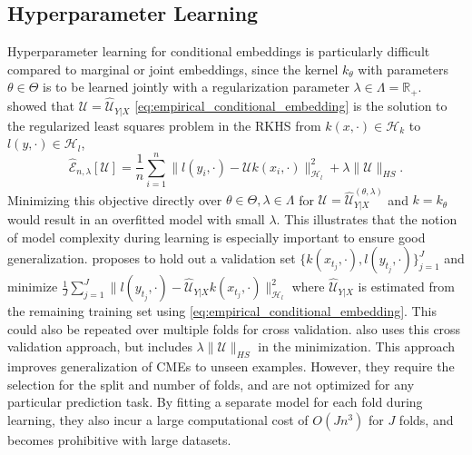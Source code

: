\documentclass[twoside]{article}
\begin{document}
		\subsection{Hyperparameter Learning}
		
			Hyperparameter learning for conditional embeddings is particularly difficult compared to marginal or joint embeddings, since the kernel $k_{\theta}$ with parameters $\theta \in \Theta$ is to be learned jointly with a regularization parameter $\lambda \in \Lambda = \mathbb{R}_{+}$. \cite{lever2012conditional} showed that $\mathcal{U} = \hat{\mathcal{U}}_{Y | X}$ \eqref{eq:empirical_conditional_embedding} is the solution to the regularized least squares problem in the RKHS from $k(x, \cdot) \in \mathcal{H}_{k}$ to $l(y, \cdot) \in \mathcal{H}_{l}$, 
			\begin{equation}
				\hat{\mathcal{E}}_{n, \lambda}[\mathcal{U}] = \frac{1}{n} \sum_{i = 1}^{n} \big\| l(y_{i}, \cdot) - \mathcal{U} k(x_{i}, \cdot) \big\|_{\mathcal{H}_{l}}^{2} + \lambda \| \mathcal{U} \|_{HS}.
			\label{eq:lever_objective}
			\end{equation}
			Minimizing this objective directly over $\theta \in \Theta, \lambda \in \Lambda$ for $\mathcal{U} = \hat{\mathcal{U}}^{(\theta, \lambda)}_{Y | X}$ and $k = k_{\theta}$ would result in an overfitted model with small $\lambda$. This illustrates that the notion of model complexity during learning is especially important to ensure good generalization. \cite{lever2012conditional} proposes to hold out a validation set $\{k(x_{t_{j}}, \cdot), l(y_{t_{j}}, \cdot)\}_{j = 1}^{J}$ and minimize $\frac{1}{J} \sum_{j = 1}^{J} \big\| l(y_{t_{j}}, \cdot) - \hat{\mathcal{U}}_{Y | X} k(x_{t_{j}}, \cdot) \big\|_{\mathcal{H}_{l}}^{2}$ where $\hat{\mathcal{U}}_{Y | X}$ is estimated from the remaining training set using \eqref{eq:empirical_conditional_embedding}. This could also be repeated over multiple folds for cross validation. \cite{song2013kernel} also uses this cross validation approach, but includes $\lambda \| \mathcal{U} \|_{HS}$ in the minimization. This approach improves generalization of \glspl{CME} to unseen examples. However, they require the selection for the split and number of folds, and are not optimized for any particular prediction task. By fitting a separate model for each fold during learning, they also incur a large computational cost of $O(J n^{3})$ for $J$ folds, and becomes prohibitive with large datasets.
			
\end{document}
